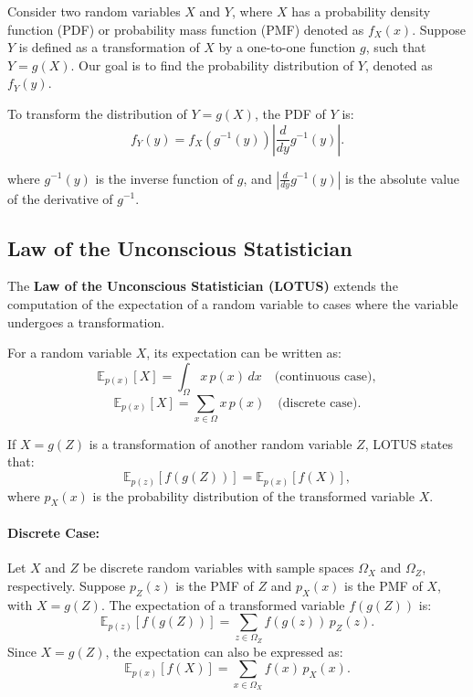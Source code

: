 Consider two random variables $X$ and $Y$, where $X$ has a probability density function (PDF) or probability mass function (PMF) denoted as $f_X(x)$. Suppose $Y$ is defined as a transformation of $X$ by a one-to-one function $g$, such that $Y = g(X)$. Our goal is to find the probability distribution of $Y$, denoted as $f_Y(y)$.



To transform the distribution of $Y = g(X)$, the PDF of $Y$ is:
\[
    f_Y(y) = f_X(g^{-1}(y)) \left| \frac{d}{dy} g^{-1}(y) \right|.
\]

where $g^{-1}(y)$ is the inverse function of $g$, and $\left| \frac{d}{dy} g^{-1}(y) \right|$ is the absolute value of the derivative of $g^{-1}$.



\subsection{Law of the Unconscious Statistician}

The \textbf{Law of the Unconscious Statistician (LOTUS)} extends the computation of the expectation of a random variable to cases where the variable undergoes a transformation.

For a random variable $X$, its expectation can be written as:
\[
    \mathbb{E}_{p(x)}[X] = \int_{\Omega} x \, p(x) \, dx \quad \text{(continuous case)},
\]
\[
    \mathbb{E}_{p(x)}[X] = \sum_{x \in \Omega} x \, p(x) \quad \text{(discrete case)}.
\]

If $X = g(Z)$ is a transformation of another random variable $Z$, LOTUS states that:
\[
    \mathbb{E}_{p(z)}[f(g(Z))] = \mathbb{E}_{p(x)}[f(X)],
\]
where $p_X(x)$ is the probability distribution of the transformed variable $X$.

\paragraph{Discrete Case:}
Let $X$ and $Z$ be discrete random variables with sample spaces $\Omega_X$ and $\Omega_Z$, respectively. Suppose $p_Z(z)$ is the PMF of $Z$ and $p_X(x)$ is the PMF of $X$, with $X = g(Z)$. The expectation of a transformed variable $f(g(Z))$ is:
\[
    \mathbb{E}_{p(z)}[f(g(Z))] = \sum_{z \in \Omega_Z} f(g(z)) \, p_Z(z).
\]
Since $X = g(Z)$, the expectation can also be expressed as:
\[
    \mathbb{E}_{p(x)}[f(X)] = \sum_{x \in \Omega_X} f(x) \, p_X(x).
\]

